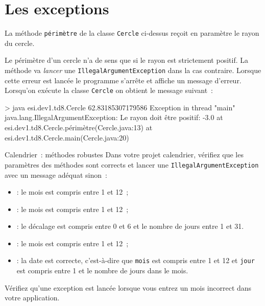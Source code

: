\documentclass[a4paper,11pt]{style-esi/td}
\begin{document}

\section{Les exceptions}

	
	
	

	La méthode \texttt{périmètre} de la classe \texttt{Cercle} ci-dessus
	reçoit en paramètre le rayon du cercle.
	
	Le périmètre d'un cercle n'a de sens que si le rayon est strictement positif.  
	La méthode va \emph{lancer} une \texttt{IllegalArgumentException} dans la cas contraire. 
	Lorsque cette erreur est lancée le programme s'arrête et affiche un message d'erreur.
	Lorsqu'on exécute la classe \texttt{Cercle} on obtient le message suivant~:
	\begin{Console}
> java esi.dev1.td8.Cercle
62.83185307179586
Exception in thread "main" java.lang.IllegalArgumentException: Le rayon doit être positif: -3.0
	at esi.dev1.td8.Cercle.périmètre(Cercle.java:13)
	at esi.dev1.td8.Cercle.main(Cercle.java:20)
\end{Console}

	\begin{Exercice}{Calendrier~: méthodes robustes}
		Dans votre projet calendrier, vérifiez que les paramètres des méthodes sont corrects et lancer une 
		\texttt{IllegalArgumentException} avec un message adéquat sinon~:
		\begin{itemize}
			\item {}: le mois est compris entre 1 et 12~;
			\item {}: le mois est compris entre 1 et 12~;
			\item {}: le décalage est compris entre 0 et 6 et 
				le nombre de jours entre 1 et 31.
			\item  {}: le mois est compris entre 1 et 12~;
			\item {}: la date est correcte, c'est-à-dire 
			que \texttt{mois} est compris entre 1 et 12 et \texttt{jour} est compris entre 1 et le nombre de 
			jours dans le mois. 
		\end{itemize}
		
		Vérifiez qu'une exception est lancée lorsque vous entrez un mois incorrect dans votre application.
	\end{Exercice}
\end{document}
